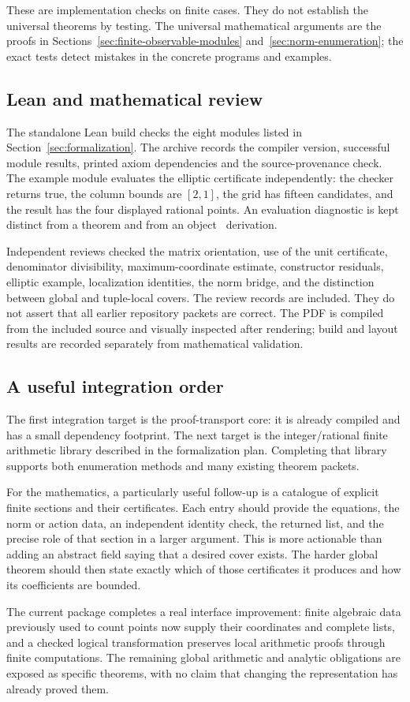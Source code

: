 These are implementation checks on finite cases. They do not establish
the universal theorems by testing. The universal mathematical arguments
are the proofs in Sections~\ref{sec:finite-observable-modules}
and~\ref{sec:norm-enumeration}; the exact tests detect mistakes in
the concrete programs and examples.

\subsection{Lean and mathematical review}

The standalone Lean build checks the eight modules listed in
Section~\ref{sec:formalization}. The archive records the compiler
version, successful module results, printed axiom dependencies and
the source-provenance check. The example module evaluates the elliptic
certificate independently: the checker returns true, the column bounds
are $[2,1]$, the grid has fifteen candidates, and the result has the
four displayed rational points. An evaluation diagnostic is kept distinct
from a theorem and from an object \ipra\ derivation.

Independent reviews checked the matrix orientation, use of the unit
certificate, denominator divisibility, maximum-coordinate estimate,
constructor residuals, elliptic example, localization identities,
the norm bridge, and the distinction between global and tuple-local
covers. The review records are included. They do not assert that all
earlier repository packets are correct. The PDF is compiled from the
included source and visually inspected after rendering; build and
layout results are recorded separately from mathematical validation.

\subsection{A useful integration order}

The first integration target is the proof-transport core: it is already
compiled and has a small dependency footprint. The next target is the
integer/rational finite arithmetic library described in the formalization
plan. Completing that library supports both enumeration methods and many
existing theorem packets.

For the mathematics, a particularly useful follow-up is a catalogue of
explicit finite sections and their certificates. Each entry should provide
the equations, the norm or action data, an independent identity check,
the returned list, and the precise role of that section in a larger
argument. This is more actionable than adding an abstract field saying
that a desired cover exists. The harder global theorem should then state
exactly which of those certificates it produces and how its coefficients
are bounded.

The current package completes a real interface improvement: finite
algebraic data previously used to count points now supply their
coordinates and complete lists, and a checked logical transformation
preserves local arithmetic proofs through finite computations. The
remaining global arithmetic and analytic obligations are exposed as
specific theorems, with no claim that changing the representation has
already proved them.
